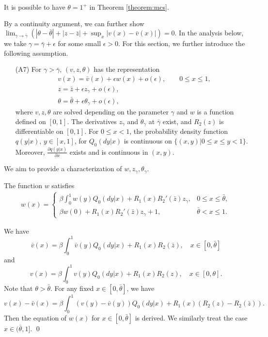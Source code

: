 \documentclass[graybox]{svmult}
\begin{document}
\begin{remark}
It is possible to have  $\theta=1^+$ in Theorem \ref{theorem:mcs}.
\end{remark}

By a continuity argument, we can further show
$\lim_{\gamma\to \bar\gamma} (|\theta-\bar \theta| +|z-\bar z| +\sup_x|v(x)-\bar v(x)|)=0$.
In the analysis below, we take $\gamma=\bar \gamma +\epsilon$ for some small $\epsilon>0$. For this section, we  further introduce the following assumption.

\begin{itemize}
\item[(A7)] \qquad For $\gamma>\bar \gamma$,
$(v,z,\theta)$ has the representation
\begin{align}
&v(x)=\bar v(x)+ \epsilon w(x) +o(\epsilon), \qquad 0\le x\le 1, \\
& z = \bar z + \epsilon z_\gamma +o( \epsilon), \\
& \theta = \bar \theta + \epsilon \theta_\gamma +o( \epsilon),
\end{align}
where $v,z,\theta$ are solved  depending on the parameter $\gamma$ and $w$ is a function defined on $[0,1]$.
 The derivatives
$z_\gamma$ and $\theta_\gamma$ at $\bar \gamma$ exist, and  $R_2(z)$ is differentiable on $[0,1]$. For  $0\le x<1$,  the probability density function  $q( y|x)$, $y\in [x, 1]$, for $Q_0(dy|x)$  is continuous on $\{(x,y)|0\le   x\le y< 1\}$. Moreover,  $\frac{\partial q(y|x)}{\partial x}$ exists and is continuous in $(x,y)$.
\end{itemize}

We aim to provide a characterization of  $w, z_\gamma, \theta_\gamma$.

\begin{theorem}
The function $w$ satisfies
\begin{align} \label{weq}
w(x)=
\begin{cases}
 \displaystyle
 \beta \int_0^1 w(y)Q_0(dy|x)+R_1(x)R_2'(\bar z) z_\gamma,& 0\le x\le \bar \theta, \\
 \displaystyle
\beta w(0)+R_1(x)R_2'(\bar z)z_\gamma+1, &  \bar \theta<x\le 1.
\end{cases}
\end{align}
\end{theorem}

\proof
We have
$$
\bar v(x)= \beta \int_0^1 \bar v( y) Q_0(dy|x) + R_1(x)R_2(\bar z), \quad x\in [0, \bar \theta]
$$
and
$$
v(x)= \beta \int_0^1 v( y) Q_0(dy|x) + R_1(x)R_2(z), \quad x\in [0,  \theta].
$$
Note that $\theta> \bar \theta$. For any fixed $x\in[0, \bar \theta]$,
we have
$$
v(x)-\bar v(x)= \beta \int_0^1 (v(y)-\bar v(y)) Q_0(dy|x)+R_1(x)(R_2(z)-R_2(\bar z)).
$$
Then the equation of $w(x)$ for $x\in [0, \bar \theta]$ is derived.
We similarly treat the case $x\in (\bar \theta, 1]$. \qed
\end{document}
